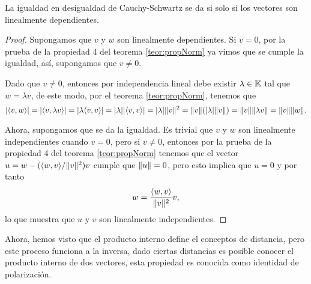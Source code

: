 \begin{coro} \label{coro:SchwartzEq}
  La igualdad en desigualdad de Cauchy-Schwartz se da si solo si los vectores son linealmente dependientes.
\end{coro}

\begin{proof}
  Supongamos que $v$ y $w$ son linealmente dependientes. Si $v = 0$, por la prueba de la propiedad 4 del teorema \ref{teor:propNorm} ya vimos que se cumple la igualdad, así, supongamos que $v \neq 0$.
  
  Dado que $v \neq 0$, entonces por independencia lineal debe existir $\lambda \in \mathbb{K}$ tal que $w = \lambda v$, de este modo, por el teorema \ref{teor:propNorm}, tenemos que
    \[
      \mathopen|\langle v,w\rangle\mathclose| = \mathopen|\langle v,\lambda v\rangle\mathclose| = \mathopen|\lambda\langle v,v\rangle\mathclose| = \mathopen|\lambda\mathclose| \mathopen|\langle v,v\rangle\mathclose| = \mathopen|\lambda\mathclose| \mathopen\|v\mathclose\|^2 = \mathopen\|v\mathclose\| (\mathopen|\lambda\mathclose| \mathopen\|v\mathclose\|) = \mathopen\|v\mathclose\| \mathopen\|\lambda v\mathclose\| = \mathopen\|v\mathclose\| \mathopen\|w\mathclose\|.
    \]
  
  Ahora, supongamos que se da la igualdad. Es trivial que $v$ y $w$ son linealmente independientes cuando $v = 0$, pero si $v \neq 0$, entonces por la prueba de la propiedad 4 del teorema \ref{teor:propNorm} tenemos que el vector $u = w - (\langle w,v\rangle/\mathopen\|v\mathclose\|^2)v$ cumple que $\mathopen\|u\mathclose\| = 0$, pero esto implica que $u = 0$ y por tanto
    \[ w = \frac{\langle w,v\rangle}{\mathopen\|v\mathclose\|^2} v, \]
  lo que muestra que $u$ y $v$ son linealmente independientes.
\end{proof}

Ahora, hemos visto que el producto interno define el conceptos de distancia, pero este proceso funciona a la inversa, dado ciertas distancias es posible conocer el producto interno de dos vectores, esta propiedad es conocida como identidad de polarización. 

